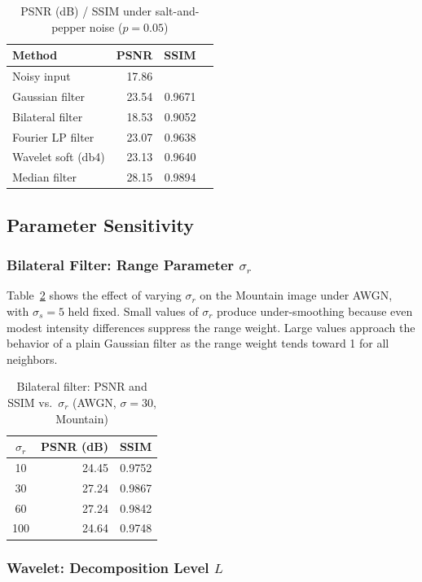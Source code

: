 \documentclass[conference]{IEEEtran}
\begin{document}
\begin{table}[H]
\centering
\caption{PSNR (dB) / SSIM under salt-and-pepper noise ($p = 0.05$)}
\label{tab:psnr_sp}
\begin{tabular}{lrrr}
\toprule
Method & PSNR & SSIM \\
\midrule
Noisy input        & 17.86 & \\
Gaussian filter    & 23.54 & 0.9671 \\
Bilateral filter   & 18.53 & 0.9052 \\
Fourier LP filter  & 23.07 & 0.9638 \\
Wavelet soft (db4) & 23.13 & 0.9640 \\
Median filter      & 28.15 & 0.9894 \\
\bottomrule
\end{tabular}
\end{table}

\subsection{Parameter Sensitivity}

\subsubsection{Bilateral Filter: Range Parameter $\sigma_r$}

Table~\ref{tab:bilateral_sweep} shows the effect of varying $\sigma_r$ on the Mountain image under AWGN, with $\sigma_s = 5$ held fixed. Small values of $\sigma_r$ produce under-smoothing because even modest intensity differences suppress the range weight. Large values approach the behavior of a plain Gaussian filter as the range weight tends toward 1 for all neighbors.

\begin{table}[H]
\centering
\caption{Bilateral filter: PSNR and SSIM vs.\ $\sigma_r$ (AWGN, $\sigma=30$, Mountain)}
\label{tab:bilateral_sweep}
\begin{tabular}{crr}
\toprule
$\sigma_r$ & PSNR (dB) & SSIM \\
\midrule
10  & 24.45 & 0.9752 \\
30  & 27.24 & 0.9867 \\
60  & 27.24 & 0.9842 \\
100 & 24.64 & 0.9748\\
\bottomrule
\end{tabular}
\end{table}

\subsubsection{Wavelet: Decomposition Level $L$}
\end{document}
